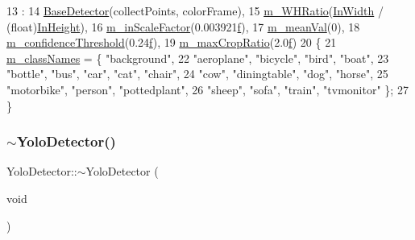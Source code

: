\begin{DoxyCode}
13     :
14       \mbox{\hyperlink{class_base_detector_a3c85e13a47dd472319dc43c60f0d102a}{BaseDetector}}(collectPoints, colorFrame),
15       \mbox{\hyperlink{class_yolo_detector_ab6b6271101b6d3a78af10c8802ac88af}{m\_WHRatio}}(\mbox{\hyperlink{class_yolo_detector_a01461f7ada4da3e8027d805f7129bab4}{InWidth}} / (\textcolor{keywordtype}{float})\mbox{\hyperlink{class_yolo_detector_a8511b801a9410af0b2715d4236a4b127}{InHeight}}),
16       \mbox{\hyperlink{class_yolo_detector_afc6432eab72fdf319af7f48753ecbcd1}{m\_inScaleFactor}}(0.003921\mbox{\hyperlink{rings_8cpp_a77369fc4d5326a16d2c603e032023528}{f}}),
17       \mbox{\hyperlink{class_yolo_detector_a126a0a3c1f91c9e6e3a878638d4b0bff}{m\_meanVal}}(0),
18       \mbox{\hyperlink{class_yolo_detector_a78b57c44b28d1f817940177d197612ed}{m\_confidenceThreshold}}(0.24\mbox{\hyperlink{rings_8cpp_a77369fc4d5326a16d2c603e032023528}{f}}),
19       \mbox{\hyperlink{class_yolo_detector_a86e05dcc3f10e2b0a1522f7513ff89e5}{m\_maxCropRatio}}(2.0\mbox{\hyperlink{rings_8cpp_a77369fc4d5326a16d2c603e032023528}{f}})
20 \{
21     \mbox{\hyperlink{class_yolo_detector_aa0a06104a5778e9009ebfb0bbc6cecab}{m\_classNames}} = \{ \textcolor{stringliteral}{"background"},
22                      \textcolor{stringliteral}{"aeroplane"}, \textcolor{stringliteral}{"bicycle"}, \textcolor{stringliteral}{"bird"}, \textcolor{stringliteral}{"boat"},
23                      \textcolor{stringliteral}{"bottle"}, \textcolor{stringliteral}{"bus"}, \textcolor{stringliteral}{"car"}, \textcolor{stringliteral}{"cat"}, \textcolor{stringliteral}{"chair"},
24                      \textcolor{stringliteral}{"cow"}, \textcolor{stringliteral}{"diningtable"}, \textcolor{stringliteral}{"dog"}, \textcolor{stringliteral}{"horse"},
25                      \textcolor{stringliteral}{"motorbike"}, \textcolor{stringliteral}{"person"}, \textcolor{stringliteral}{"pottedplant"},
26                      \textcolor{stringliteral}{"sheep"}, \textcolor{stringliteral}{"sofa"}, \textcolor{stringliteral}{"train"}, \textcolor{stringliteral}{"tvmonitor"} \};
27 \}
\end{DoxyCode}
\mbox{\label{class_yolo_detector_a0ccb411c962a5ef58288f8dbc7a4b244}} 
\subsubsection{\texorpdfstring{$\sim$\+Yolo\+Detector()}{~YoloDetector()}}
{\footnotesize\ttfamily Yolo\+Detector\+::$\sim$\+Yolo\+Detector (\begin{DoxyParamCaption}\item[{void}]{ }\end{DoxyParamCaption})}



